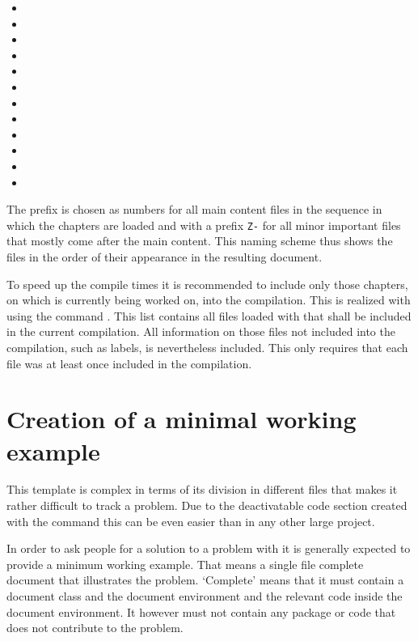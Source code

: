 \begin{itemize}[noitemsep]
\item {}
\item {} 
\item {}
\item {}
\item {}
\item {}
\item {}
\item {}
\item {}
\item {}
\item {}
\item {}
\end{itemize}

The prefix is chosen as numbers for all main content files in the sequence in which the chapters are loaded and with a prefix \texttt{Z-} for all minor important files that mostly come after the main content. This naming scheme thus shows the files in the order of their appearance in the resulting document.

To speed up the compile times it is recommended to include only those chapters, on which is currently being worked on, into the compilation.
This is realized with \latex using the command . This list contains all files loaded with  that shall be included in the current compilation. All information on those files not included into the compilation, such as labels, is nevertheless included. This only requires that each file was at least once included in the compilation.

\section{Creation of a minimal working example}
\label{sec:doc:faq:mwe}

This template is complex in terms of its division in different files that makes it rather difficult to track a problem. Due to the deactivatable code section created with the command  this can be even easier than in any other large \latex project.

In order to ask people for a solution to a problem with \latex it is generally expected to provide a minimum working example. That means a single file \latex complete document that illustrates the problem. `Complete’ means that it must contain a document class and the document environment and the relevant code inside the document environment. It however must not contain any package or code that does not contribute to the problem.

